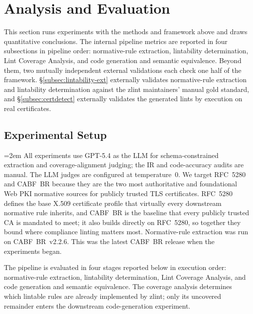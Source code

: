 \section{Analysis and Evaluation}
\label{sec:eval}

This section runs experiments with the methods and framework above and draws
quantitative conclusions. The internal pipeline metrics are reported in four
subsections in pipeline order: normative-rule extraction, lintability
determination, Lint Coverage Analysis, and code generation and semantic
equivalence. Beyond them, two mutually independent external validations
each check one half of the framework. \S\ref{subsec:lintability-ext} externally
validates normative-rule extraction and lintability determination against the
zlint maintainers' manual gold standard, and \S\ref{subsec:certdetect} externally
validates the generated lints by execution on real certificates.

\subsection{Experimental Setup}
\label{subsec:setup}

\begingroup\emergencystretch=2em\relax
All experiments use GPT-5.4 as the LLM for schema-constrained extraction and
coverage-alignment judging; the IR and code-accuracy audits are manual. The LLM
judges are configured at temperature~$0$. We target
RFC~5280 and CABF~BR because they are
the two most authoritative and foundational Web PKI normative sources for publicly
trusted TLS certificates. RFC~5280 defines the base X.509 certificate profile that
virtually every downstream normative rule inherits, and CABF~BR is the baseline that every
publicly trusted CA is mandated to meet; it also builds directly on RFC~5280, so
together they bound where compliance linting matters most. Normative-rule extraction was run on CABF~BR~v2.2.6. This was the latest
CABF~BR release when the experiments began.
\par\endgroup


The pipeline is evaluated in four stages reported below in execution order:
normative-rule extraction, lintability determination, Lint Coverage Analysis,
and code generation and semantic equivalence. The coverage analysis determines
which lintable rules are already implemented by zlint; only its uncovered
remainder enters the downstream code-generation experiment.

